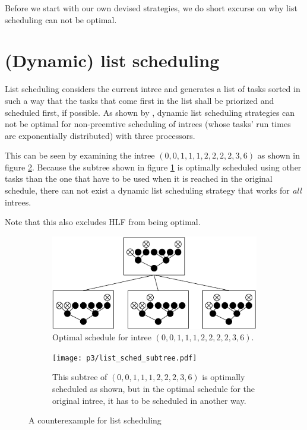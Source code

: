 Before we start with our own devised strategies, we do short excurse on why list scheduling can not be optimal.

\section{(Dynamic) list scheduling}
\label{sec:suboptimal-strategies-list-scheduling}

List scheduling considers the current intree and generates a list of tasks sorted in such a way that the tasks that come first in the list shall be priorized and scheduled first, if possible. As shown by \cite{MoritzMaasDiploma}, dynamic list scheduling strategies can not be optimal for non-preemtive scheduling of intrees (whose tasks' run times are exponentially distributed) with three processors.

This can be seen by examining the intree $(0,0,1,1,1,2,2,2,2,3,6)$ as shown in figure \ref{fig:list-scheduling-counter-example}. Because the subtree shown in figure \ref{fig:list-schedule-counter-example-subtree} is optimally scheduled using other tasks than the one that have to be used when it is reached in the original schedule, there can not exist a dynamic list scheduling strategy that works for \emph{all} intrees.

Note that this also excludes HLF from being optimal.

\begin{figure}[ht]
  \centering
  \begin{subfigure}[b]{.5\textwidth}
    \centering
    \includegraphics{p3/list_sched_0011122236_opt_sched.pdf}
    \caption{Optimal schedule for intree $(0,0,1,1,1,2,2,2,2,3,6)$.}
  \end{subfigure}
  \quad
  \begin{subfigure}[b]{.4\textwidth}
    \centering
    \vfill
    \texttt{[image: p3/list\_sched\_subtree.pdf]}
    \vfill
    \caption{This subtree of $(0,0,1,1,1,2,2,2,3,6)$ is optimally scheduled as shown, but in the optimal schedule for the original intree, it has to be scheduled in another way.}
    \label{fig:list-schedule-counter-example-subtree}
  \end{subfigure}
  \caption{A counterexample for list scheduling}
  \label{fig:list-scheduling-counter-example}
\end{figure}

